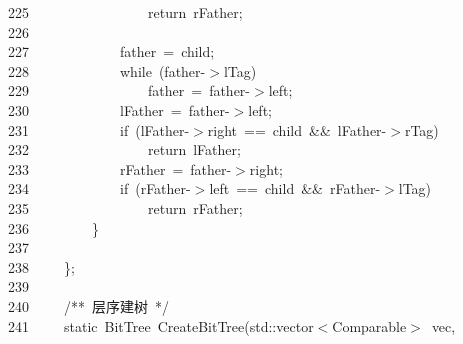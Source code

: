 \documentclass[11pt,a4paper]{ctexart}
\newcommand{\hlstd}[1]{\textcolor[rgb]{0.2,0.2,0.2}{#1}}
\newcommand{\hlcom}[1]{\textcolor[rgb]{0.59,0.59,0.59}{#1}}
\newcommand{\hlopt}[1]{\textcolor[rgb]{0.2,0.2,0.2}{#1}}
\newcommand{\hllin}[1]{\textcolor[rgb]{0.59,0.59,0.59}{#1}}
\newcommand{\hlkwa}[1]{\textcolor[rgb]{0.23,0.42,0.78}{#1}}
\newcommand{\hlkwb}[1]{\textcolor[rgb]{0.63,0,0.31}{#1}}
\newcommand{\hlkwc}[1]{\textcolor[rgb]{0,0.63,0.31}{#1}}
\newcommand{\hlkwd}[1]{\textcolor[rgb]{0.78,0.23,0.41}{#1}}
\begin{document}
\hllin{225\ }\hlstd{}\hlstd{\ \ \ \ \ \ \ \ \ \ \ \ \ \ \ \ }\hlstd{}\hlkwa{return\ }\hlstd{rFather}\hlopt{;}\\
\hllin{226\ }\hlstd{}\\
\hllin{227\ }\hlstd{}\hlstd{\ \ \ \ \ \ \ \ \ \ \ \ }\hlstd{father\ }\hlopt{=\ }\hlstd{child}\hlopt{;}\\
\hllin{228\ }\hlstd{}\hlstd{\ \ \ \ \ \ \ \ \ \ \ \ }\hlstd{}\hlkwa{while\ }\hlstd{}\hlopt{(}\hlstd{father}\hlopt{{-}$>$}\hlstd{lTag}\hlopt{)}\\
\hllin{229\ }\hlstd{}\hlstd{\ \ \ \ \ \ \ \ \ \ \ \ \ \ \ \ }\hlstd{father\ }\hlopt{=\ }\hlstd{father}\hlopt{{-}$>$}\hlstd{left}\hlopt{;}\\
\hllin{230\ }\hlstd{}\hlstd{\ \ \ \ \ \ \ \ \ \ \ \ }\hlstd{lFather\ }\hlopt{=\ }\hlstd{father}\hlopt{{-}$>$}\hlstd{left}\hlopt{;}\\
\hllin{231\ }\hlstd{}\hlstd{\ \ \ \ \ \ \ \ \ \ \ \ }\hlstd{}\hlkwa{if\ }\hlstd{}\hlopt{(}\hlstd{lFather}\hlopt{{-}$>$}\hlstd{right\ }\hlopt{==\ }\hlstd{child\ }\hlopt{\&\&\ }\hlstd{lFather}\hlopt{{-}$>$}\hlstd{rTag}\hlopt{)}\\
\hllin{232\ }\hlstd{}\hlstd{\ \ \ \ \ \ \ \ \ \ \ \ \ \ \ \ }\hlstd{}\hlkwa{return\ }\hlstd{lFather}\hlopt{;}\\
\hllin{233\ }\hlstd{}\hlstd{\ \ \ \ \ \ \ \ \ \ \ \ }\hlstd{rFather\ }\hlopt{=\ }\hlstd{father}\hlopt{{-}$>$}\hlstd{right}\hlopt{;}\\
\hllin{234\ }\hlstd{}\hlstd{\ \ \ \ \ \ \ \ \ \ \ \ }\hlstd{}\hlkwa{if\ }\hlstd{}\hlopt{(}\hlstd{rFather}\hlopt{{-}$>$}\hlstd{left\ }\hlopt{==\ }\hlstd{child\ }\hlopt{\&\&\ }\hlstd{rFather}\hlopt{{-}$>$}\hlstd{lTag}\hlopt{)}\\
\hllin{235\ }\hlstd{}\hlstd{\ \ \ \ \ \ \ \ \ \ \ \ \ \ \ \ }\hlstd{}\hlkwa{return\ }\hlstd{rFather}\hlopt{;}\\
\hllin{236\ }\hlstd{}\hlstd{\ \ \ \ \ \ \ \ }\hlstd{}\hlopt{\}}\\
\hllin{237\ }\hlstd{}\\
\hllin{238\ }\hlstd{}\hlstd{\ \ \ \ }\hlstd{}\hlopt{\};}\\
\hllin{239\ }\hlstd{}\\
\hllin{240\ }\hlstd{}\hlstd{\ \ \ \ }\hlstd{}\hlcom{/{*}{*}\ 层序建树\ {*}/}\hlstd{}\\
\hllin{241\ }\hlstd{}\hlstd{\ \ \ \ }\hlstd{}\hlkwb{static\ }\hlstd{BitTree\ }\hlkwd{CreateBitTree}\hlstd{}\hlopt{(}\hlstd{}\hlkwc{std}\hlstd{}\hlopt{::}\hlstd{vector}\hlopt{$<$}\hlstd{Comparable}\hlopt{$>$\ }\hlstd{vec}\hlopt{,}\Righttorque\\
\end{document}
